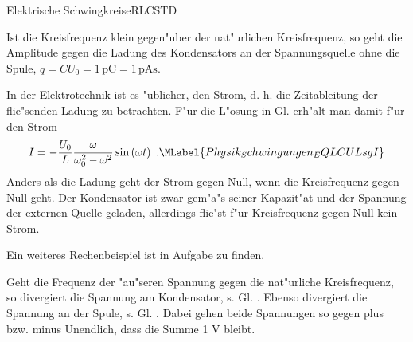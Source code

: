 \begin{MXContent}{Elektrische Schwingkreise}{RLC}{STD}
\begin{MExample}
Ist die Kreisfrequenz klein gegen"uber der nat"urlichen Kreisfrequenz, so geht die Amplitude gegen die Ladung des Kondensators an der Spannungsquelle ohne die Spule, $q = C U_0 = 1\,\text{pC}= 1\,\text{pAs}$.

\end{MExample}

In der Elektrotechnik ist es "ublicher, den Strom, d. h. die Zeitableitung der flie"senden Ladung zu betrachten. F"ur die L"osung in Gl.  erh"alt man damit f"ur den Strom
\begin{equation}
  I = -\frac{U_0}{L}\frac{\omega}{\omega_0^2-\omega^2} \sin\left(\omega t\right) \; .\MLabel{Physik_Schwingungen_EQLCULsgI}
\end{equation}
Anders als die Ladung geht der Strom gegen Null, wenn die Kreisfrequenz gegen Null geht. Der Kondensator ist zwar gem"a"s seiner Kapazit"at und der Spannung der externen Quelle geladen, allerdings flie"st f"ur Kreisfrequenz gegen Null kein Strom.

\begin{MExample}

\begin{center}
\end{center}

\end{MExample}

Ein weiteres Rechenbeispiel ist in Aufgabe
zu finden.

Geht die Frequenz der "au"seren Spannung gegen die nat"urliche Kreisfrequenz, so divergiert die Spannung am Kondensator, s. Gl. . Ebenso divergiert die Spannung an der Spule, s. Gl. . Dabei gehen beide Spannungen so gegen plus bzw. minus Unendlich, dass die Summe 1 V bleibt.


\end{MXContent}
